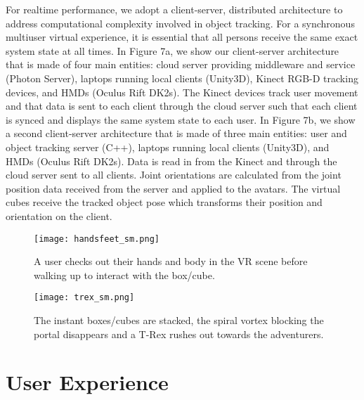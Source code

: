 \documentclass{sigchi}
\begin{document}
For realtime performance, we adopt a client-server, distributed architecture to address computational complexity involved in object tracking. For a synchronous multiuser virtual experience, it is essential that all persons receive the same exact system state at all times. In Figure 7a, we show our client-server architecture that is made of four main entities: cloud server providing middleware and service (Photon Server), laptops running local clients (Unity3D), Kinect RGB-D tracking devices, and HMDs (Oculus Rift DK2s). The Kinect devices track user movement and that data is sent to each client through the cloud server such that each client is synced and displays the same system state to each user. In Figure 7b, we show a second client-server architecture that is made of three main entities: user and object tracking server (C++), laptops running local clients (Unity3D), and HMDs (Oculus Rift DK2s).  Data is read in from the Kinect and through the cloud server sent to all clients. Joint orientations are calculated from the joint position data received from the server and applied to the avatars. The virtual cubes receive the tracked object pose which transforms their position and orientation on the client.

\begin{figure}[!t]
\centering
\texttt{[image: handsfeet\_sm.png]}
\caption{A user checks out their hands and body in the VR scene before walking up to interact with the box/cube.}
\label{fig:bridge}
\end{figure}

\begin{figure}[!t]
\centering
\texttt{[image: trex\_sm.png]}
\caption{The instant boxes/cubes are stacked, the spiral vortex blocking the portal disappears and a T-Rex rushes out towards the adventurers.}
\label{fig:bridge}
\end{figure}

\section{User Experience}
\end{document}
